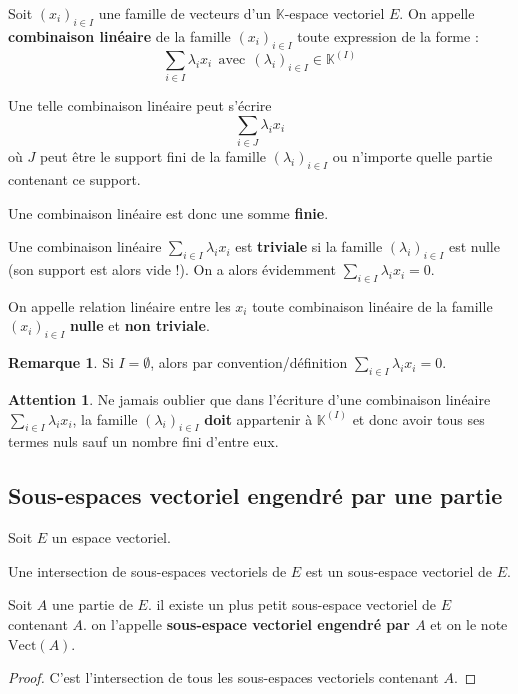 \documentclass[french]{article}
\newcommand{\K}{\mathbb{K}}
\newcommand{\Vect}{\text{Vect}}
\theoremstyle{plain}
\theoremstyle{definition}
\newtheorem*{rmq}{Remarque}
\newtheorem*{attention}{Attention}
\theoremstyle{remark}
\begin{document}
\begin{dfn}{}
	Soit $(x_i)_{i\in I}$ une famille de vecteurs d'un $\K$-espace vectoriel $E$. On appelle \textbf{combinaison linéaire} de la famille $(x_i)_{i\in I}$ toute expression de la forme : $$\sum_{i\in I}\lambda_ix_i\ \ \text{avec}\ \ (\lambda_i)_{i\in I}\in\K^{(I)}$$
\end{dfn}
Une telle combinaison linéaire peut s'écrire $$\sum_{i\in J}\lambda_i x_i$$ où $J$ peut être le support fini de la famille $(\lambda_i)_{i\in I}$ ou n'importe quelle partie contenant ce support.

Une combinaison linéaire est donc une somme \textbf{finie}.

Une combinaison linéaire $\displaystyle\sum_{i\in I}\lambda_ix_i$ est \textbf{triviale} si la famille $(\lambda_i)_{i\in I}$ est nulle (son support est alors vide !). On a alors évidemment $\displaystyle\sum_{i\in I}\lambda_ix_i=0$.

On appelle relation linéaire entre les $x_i$ toute combinaison linéaire de la famille $(x_i)_{i\in I}$ \textbf{nulle} et \textbf{non triviale}.

\begin{rmq}
	Si $I=\emptyset$, alors par convention/définition $\displaystyle\sum_{i\in I}\lambda_ix_i=0$.
\end{rmq}

\begin{attention}
	Ne jamais oublier que dans l'écriture d'une combinaison linéaire $\displaystyle\sum_{i\in I}\lambda_ix_i$, la famille $(\lambda_i)_{i\in I}$ \textbf{doit} appartenir à $\K^{(I)}$ et donc avoir tous ses termes nuls sauf un nombre fini d'entre eux.
\end{attention}

\subsection{Sous-espaces vectoriel engendré par une partie}
Soit $E$ un espace vectoriel.

\begin{prop}
	Une intersection de sous-espaces vectoriels de $E$ est un sous-espace vectoriel de $E$.
\end{prop}

\begin{dfn}{}
	Soit $A$ une partie de $E$. il existe un plus petit sous-espace vectoriel de $E$ contenant $A$. on l'appelle \textbf{sous-espace vectoriel engendré par $A$} et on le note $\Vect(A)$.
\end{dfn}
\begin{proof}
	C'est l'intersection de tous les sous-espaces vectoriels contenant $A$.
\end{proof}
\end{document}
